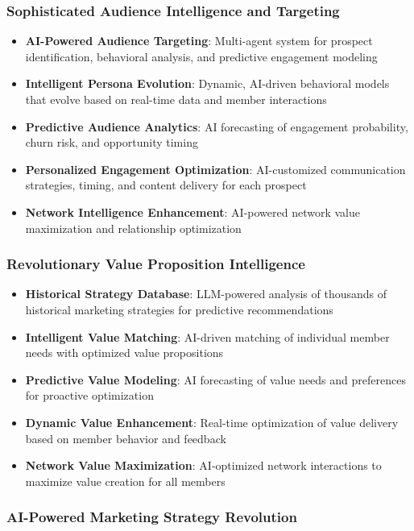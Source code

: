 \subsubsection{Sophisticated Audience Intelligence and Targeting}

\begin{itemize}
    \item \textbf{AI-Powered Audience Targeting}: Multi-agent system for prospect identification, behavioral analysis, and predictive engagement modeling
    \item \textbf{Intelligent Persona Evolution}: Dynamic, AI-driven behavioral models that evolve based on real-time data and member interactions
    \item \textbf{Predictive Audience Analytics}: AI forecasting of engagement probability, churn risk, and opportunity timing
    \item \textbf{Personalized Engagement Optimization}: AI-customized communication strategies, timing, and content delivery for each prospect
    \item \textbf{Network Intelligence Enhancement}: AI-powered network value maximization and relationship optimization
\end{itemize}

\subsubsection{Revolutionary Value Proposition Intelligence}

\begin{itemize}
    \item \textbf{Historical Strategy Database}: LLM-powered analysis of thousands of historical marketing strategies for predictive recommendations
    \item \textbf{Intelligent Value Matching}: AI-driven matching of individual member needs with optimized value propositions
    \item \textbf{Predictive Value Modeling}: AI forecasting of value needs and preferences for proactive optimization
    \item \textbf{Dynamic Value Enhancement}: Real-time optimization of value delivery based on member behavior and feedback
    \item \textbf{Network Value Maximization}: AI-optimized network interactions to maximize value creation for all members
\end{itemize}

\subsubsection{AI-Powered Marketing Strategy Revolution}

